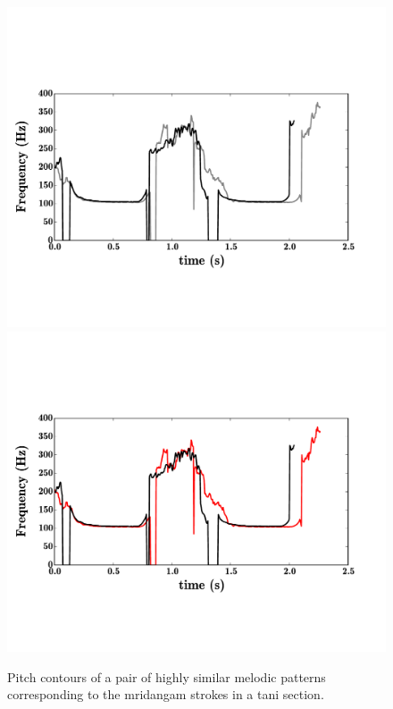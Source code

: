 {\begin{figure}
	\begin{center}
		\ifdefined\PRINTVER
			\includegraphics[width=\figSizeSeventy]{ch05_preprocessing/figures/taniPatterns_BW.pdf}
		\else
			\includegraphics[width=\figSizeSeventy]{ch05_preprocessing/figures/taniPatterns.pdf}
		\fi
	\end{center}
	\caption[Melodic patterns corresponding to the \gls{mridangam} strokes]{Pitch contours of a pair of highly similar melodic patterns corresponding to the \gls{mridangam} strokes in a \gls{tani} section.}
	\label{fig:pitch_pattern_tani}
\end{figure}

}
